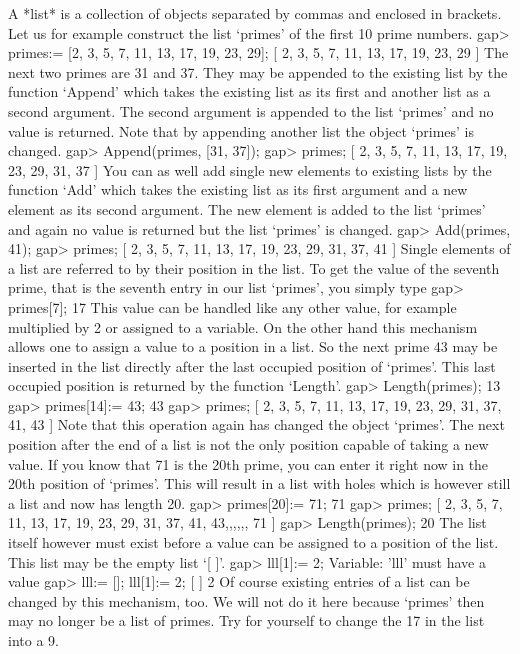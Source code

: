 %
A *list* is a collection of objects separated by  commas and enclosed  in
brackets.  Let us for example construct the list `primes' of the first 10
prime numbers.
\beginexample
gap> primes:= [2, 3, 5, 7, 11, 13, 17, 19, 23, 29];
[ 2, 3, 5, 7, 11, 13, 17, 19, 23, 29 ]
\endexample
The next two primes are  31 and 37.  They may be appended to the existing
list by the function `Append' which takes  the existing list as its first
and another list as a second argument.  The  second argument  is appended
to the list `primes' and  no  value is returned.  Note that  by appending
another list the object `primes' is changed.
\beginexample
gap> Append(primes, [31, 37]);
gap> primes;
[ 2, 3, 5, 7, 11, 13, 17, 19, 23, 29, 31, 37 ] 
\endexample
You can as well add single new elements to existing lists by the function
`Add'  which takes  the existing list  as its  first argument  and  a new
element as  its second argument.  The  new  element  is added to the list
`primes' and again no value is returned but the list `primes' is changed.
\beginexample
gap> Add(primes, 41);
gap> primes;
[ 2, 3, 5, 7, 11, 13, 17, 19, 23, 29, 31, 37, 41 ] 
\endexample
Single elements of a list are referred to by their position in the  list.
To get the value  of the seventh prime, that is the seventh entry in  our
list `primes', you simply type
\beginexample
gap> primes[7];
17 
\endexample
This value can be handled like any other value, for example multiplied by 2
or assigned to a  variable. On the other hand  this mechanism allows one to
assign a value to  a position in  a  list. So the   next prime 43  may be
inserted  in the   list directly  after the  last   occupied position  of
`primes'. This  last occupied    position  is returned  by  the  function
`Length'.
\beginexample
gap> Length(primes);
13
gap> primes[14]:= 43;
43
gap> primes;
[ 2, 3, 5, 7, 11, 13, 17, 19, 23, 29, 31, 37, 41, 43 ] 
\endexample
Note that this operation again has changed the object `primes'.  The
next position after the end of a list is not the only position capable
of taking a new value.  If you know that 71 is the 20th prime, you can
enter it right now in the 20th position of `primes'.  This will result
in a list with holes which is however still a list and now has length
20.
\beginexample
gap> primes[20]:= 71;
71
gap> primes;
[ 2, 3, 5, 7, 11, 13, 17, 19, 23, 29, 31, 37, 41, 43,,,,,, 71 ]
gap> Length(primes);
20 
\endexample
The list itself however must  exist before a  value can be  assigned to a
position of the list.  This list may be the empty list `[ ]'.
\begintt
gap> lll[1]:= 2;
Variable: 'lll' must have a value
\endtt
\beginexample
gap> lll:= []; lll[1]:= 2;
[  ]
2 
\endexample
Of course  existing entries of a list  can be  changed by this mechanism,
too. We will not do it here because `primes' then may no longer be a list
of primes. Try for yourself to change the 17 in the list into a 9.

